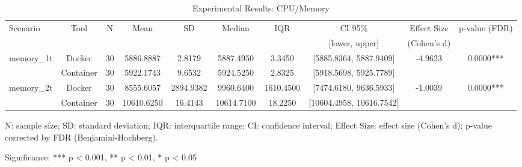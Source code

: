 \documentclass{article}
\begin{document}

\begin{table}[h]
\centering
\small
\caption{Experimental Results: CPU/Memory}
\label{tab:cpu_memory}
\begin{tabular}{lccccccccc}
\toprule
Scenario & Tool & N & Mean & SD & Median & IQR & CI 95\% & Effect Size & p-value (FDR) \\
 & & & & & & & [lower, upper] & (Cohen's d) & \\
\midrule
\multirow{2}{*}{memory\_1t} & Docker & 30 & 5886.8887 & 2.8179 & 5887.4950 & 3.3450 & [5885.8364, 5887.9409] & -4.9623 & 0.0000*** \\
 & Container & 30 & 5922.1743 & 9.6532 & 5924.5250 & 2.8325 & [5918.5698, 5925.7789] &  &  \\
\midrule
\multirow{2}{*}{memory\_2t} & Docker & 30 & 8555.6057 & 2894.9382 & 9960.6400 & 1610.4500 & [7474.6180, 9636.5933] & -1.0039 & 0.0000*** \\
 & Container & 30 & 10610.6250 & 16.4143 & 10614.7100 & 18.2250 & [10604.4958, 10616.7542] &  &  \\
\midrule
\bottomrule
\end{tabular}
\begin{tablenotes}
\small
\item N: sample size; SD: standard deviation; IQR: interquartile range; CI: confidence interval; Effect Size: effect size (Cohen's d); p-value corrected by FDR (Benjamini-Hochberg).
\item Significance: *** p < 0.001, ** p < 0.01, * p < 0.05
\end{tablenotes}
\end{table}
\end{document}
